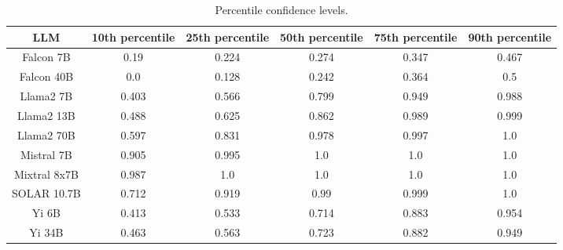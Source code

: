 \begin{table*}
\centering
\begin{tabular}{c|c|c|c|c|c}
LLM & 10th percentile & 25th percentile & 50th percentile & 75th percentile & 90th percentile\\ \hline
Falcon 7B & 0.19 & 0.224 & 0.274 & 0.347 & 0.467\\
Falcon 40B & 0.0 & 0.128 & 0.242 & 0.364 & 0.5\\
Llama2 7B & 0.403 & 0.566 & 0.799 & 0.949 & 0.988\\
Llama2 13B & 0.488 & 0.625 & 0.862 & 0.989 & 0.999\\
Llama2 70B & 0.597 & 0.831 & 0.978 & 0.997 & 1.0\\
Mistral 7B & 0.905 & 0.995 & 1.0 & 1.0 & 1.0\\
Mixtral 8x7B & 0.987 & 1.0 & 1.0 & 1.0 & 1.0\\
SOLAR 10.7B & 0.712 & 0.919 & 0.99 & 0.999 & 1.0\\
Yi 6B & 0.413 & 0.533 & 0.714 & 0.883 & 0.954\\
Yi 34B & 0.463 & 0.563 & 0.723 & 0.882 & 0.949\\
\hline
\end{tabular}
\caption{Percentile confidence levels.}
\label{tab:percentile_conf}
\end{table*}
